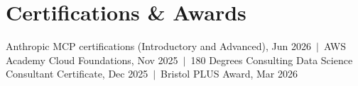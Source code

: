 \documentclass[a4paper,10pt]{article}
\begin{document}
\section{Certifications \& Awards}
Anthropic MCP certifications (Introductory and Advanced), Jun 2026 \,$|$\, AWS Academy Cloud Foundations, Nov 2025 \,$|$\, 180 Degrees Consulting Data Science Consultant Certificate, Dec 2025 \,$|$\, Bristol PLUS Award, Mar 2026
\end{document}
